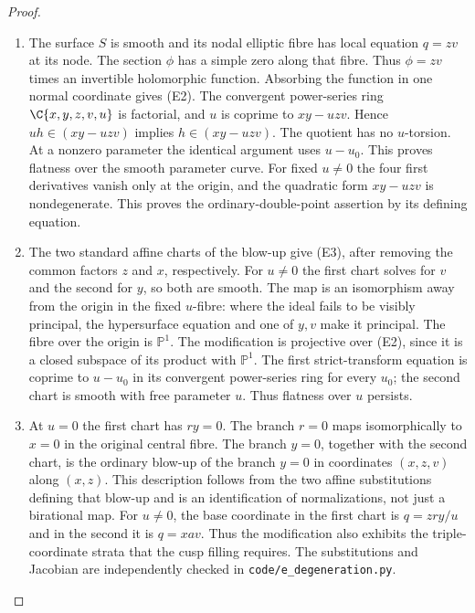 \begin{proof}
\begin{enumerate}[label=\arabic*.,leftmargin=*]
\item The surface $S$ is smooth and its nodal elliptic fibre has local
equation $q=zv$ at its node. The section $\phi$ has a simple zero
along that fibre. Thus $\phi=zv$ times an invertible holomorphic
function. Absorbing the function in one normal coordinate gives (E2).
The convergent power-series ring $\C\{x,y,z,v,u\}$ is factorial,
and $u$ is coprime to $xy-uzv$. Hence $uh\in(xy-uzv)$ implies
$h\in(xy-uzv)$. The quotient has no $u$-torsion. At a nonzero
parameter the identical argument uses $u-u_0$. This proves flatness
over the smooth parameter curve.
For fixed $u\ne0$ the four first derivatives vanish only at the
origin, and the quadratic form $xy-uzv$ is nondegenerate. This proves
the ordinary-double-point assertion by its defining equation.

\item The two standard affine charts of the blow-up give (E3), after
removing the common factors $z$ and $x$, respectively. For $u\ne0$
the first chart solves for $v$ and the second for $y$, so both are
smooth. The map is an isomorphism away from the origin in the fixed
$u$-fibre: where the ideal fails to be visibly principal, the
hypersurface equation and one of $y,v$ make it principal. The fibre
over the origin is $\mathbb P^1$. The modification is projective
over (E2), since it is a closed subspace of its product with
$\mathbb P^1$. The first strict-transform equation is coprime to
$u-u_0$ in its convergent power-series ring for every $u_0$; the
second chart is smooth with free parameter $u$. Thus flatness over
$u$ persists.

\item At $u=0$ the first chart has $ry=0$. The branch $r=0$ maps
isomorphically to $x=0$ in the original central fibre. The branch
$y=0$, together with the second chart, is the ordinary blow-up of the
branch $y=0$ in coordinates $(x,z,v)$ along $(x,z)$. This description
follows from the two affine substitutions defining that blow-up and
is an identification of normalizations, not just a birational map.
For $u\ne0$, the base coordinate in the first chart is
$q=zry/u$ and in the second it is $q=xav$. Thus the modification also
exhibits the triple-coordinate strata that the cusp filling requires.
The substitutions and Jacobian are independently checked in
\texttt{code/e\_degeneration.py}.
\end{enumerate}
\end{proof}

